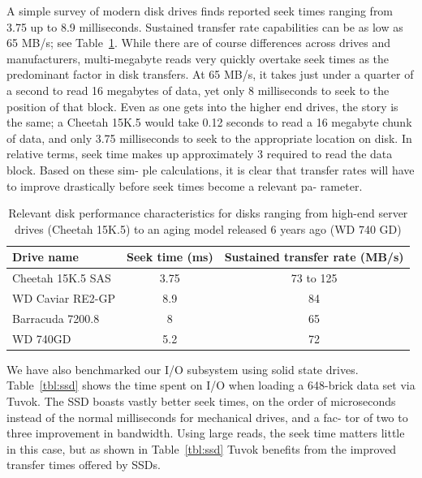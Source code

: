A simple survey of modern disk drives finds reported seek
times ranging from 3.75 up to 8.9 milliseconds. Sustained
transfer rate capabilities can be as low as 65 MB/s; see
Table~\ref{tbl:disks}.  While there are of course differences across
drives and manufacturers, multi-megabyte reads very quickly overtake
seek times as the predominant factor in disk transfers. At 65 MB/s, it
takes just under a quarter of a second to read 16 megabytes of data,
yet only 8 milliseconds to seek to the position of that block. Even as
one gets into the higher end drives, the story is the same; a Cheetah
15K.5 would take 0.12 seconds to read a 16 megabyte chunk of data, and
only 3.75 milliseconds to seek to the appropriate location on disk.
In relative terms, seek time makes up approximately 3%
required to read the data block. Based on these sim- ple calculations,
it is clear that transfer rates will have to improve drastically before
seek times become a relevant pa- rameter.

\begin{table}
	\begin{center}
	\begin{tabular}{l|cc}
	\textbf{Drive name} & \textbf{Seek time (ms)} &
		\textbf{Sustained transfer rate (MB/s)}\\\hline
	Cheetah 15K.5 SAS & 3.75 & 73 to 125\\
	WD Caviar RE2-GP & 8.9 & 84\\
	Barracuda 7200.8 & 8 & 65\\
	WD 740GD & 5.2 & 72\\
	\end{tabular}
	\end{center}

  \caption{Relevant disk performance characteristics for disks ranging
  from high-end server drives (Cheetah 15K.5) to an aging model
  released 6 years ago (WD 740 GD)}
	\label{tbl:disks}
\end{table}

We have also benchmarked our I/O subsystem using solid
state drives. Table~\ref{tbl:ssd} shows the time spent on I/O when
loading a 648-brick data set via Tuvok. The SSD boasts vastly better
seek times, on the order of microseconds instead of the normal
milliseconds for mechanical drives, and a fac- tor of two to three
improvement in bandwidth. Using large reads, the seek time matters
little in this case, but as shown in Table~\ref{tbl:ssd} Tuvok benefits
from the improved transfer times offered by SSDs.

